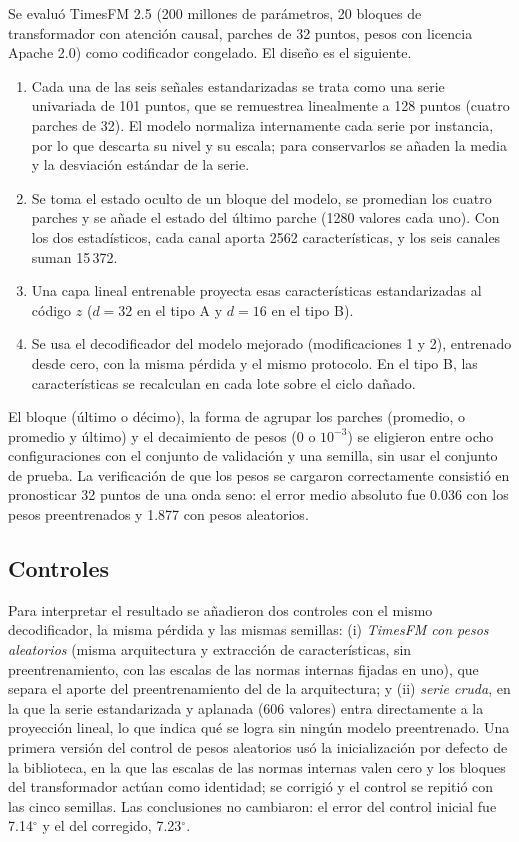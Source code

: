 \documentclass[11pt,a4paper]{amsart}
\newcommand{\gr}{$^{\circ}$}
\begin{document}
Se evaluó TimesFM 2.5 \cite{das2024timesfm} (200 millones de parámetros, 20 bloques de transformador con atención causal, parches de 32 puntos, pesos con licencia Apache 2.0) como codificador congelado. El diseño es el siguiente.
\begin{enumerate}
\item Cada una de las seis señales estandarizadas se trata como una serie univariada de 101 puntos, que se remuestrea linealmente a 128 puntos (cuatro parches de 32). El modelo normaliza internamente cada serie por instancia, por lo que descarta su nivel y su escala; para conservarlos se añaden la media y la desviación estándar de la serie.
\item Se toma el estado oculto de un bloque del modelo, se promedian los cuatro parches y se añade el estado del último parche (1280 valores cada uno). Con los dos estadísticos, cada canal aporta 2562 características, y los seis canales suman 15\,372.
\item Una capa lineal entrenable proyecta esas características estandarizadas al código $z$ ($d=32$ en el tipo A y $d=16$ en el tipo B).
\item Se usa el decodificador del modelo mejorado (modificaciones 1 y 2), entrenado desde cero, con la misma pérdida y el mismo protocolo. En el tipo B, las características se recalculan en cada lote sobre el ciclo dañado.
\end{enumerate}
El bloque (último o décimo), la forma de agrupar los parches (promedio, o promedio y último) y el decaimiento de pesos ($0$ o $10^{-3}$) se eligieron entre ocho configuraciones con el conjunto de validación y una semilla, sin usar el conjunto de prueba. La verificación de que los pesos se cargaron correctamente consistió en pronosticar 32 puntos de una onda seno: el error medio absoluto fue 0.036 con los pesos preentrenados y 1.877 con pesos aleatorios.

\subsection{Controles}

Para interpretar el resultado se añadieron dos controles con el mismo decodificador, la misma pérdida y las mismas semillas: (i) \textit{TimesFM con pesos aleatorios} (misma arquitectura y extracción de características, sin preentrenamiento, con las escalas de las normas internas fijadas en uno), que separa el aporte del preentrenamiento del de la arquitectura; y (ii) \textit{serie cruda}, en la que la serie estandarizada y aplanada (606 valores) entra directamente a la proyección lineal, lo que indica qué se logra sin ningún modelo preentrenado. Una primera versión del control de pesos aleatorios usó la inicialización por defecto de la biblioteca, en la que las escalas de las normas internas valen cero y los bloques del transformador actúan como identidad; se corrigió y el control se repitió con las cinco semillas. Las conclusiones no cambiaron: el error del control inicial fue 7.14\gr{} y el del corregido, 7.23\gr.
\end{document}
